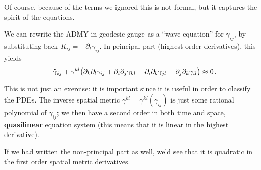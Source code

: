 \documentclass[main.tex]{subfiles}
\begin{document}
Of course, because of the terms we ignored this is not formal,  but it captures the spirit of the equations. 

We can rewrite the ADMY in geodesic gauge as a ``wave equation'' for \(\gamma_{ij}\), by substituting back \(K_{ij} = - \partial_{t} \gamma_{ij}\).
In principal part (highest order derivatives), this yields 
%
\begin{align}
- \ddot{\gamma}_{ij} + \gamma^{kl} \qty(\partial_{k} \partial_{l} \gamma_{ij} + \partial_{i} \partial_{j} \gamma_{kl} - \partial_{i} \partial_{k} \gamma_{jl} - \partial_{j} \partial_{k} \gamma_{il}) \approx 0 
\,.
\end{align}


This is not just an exercise: it is important since it is useful in order to classify the PDEs. 
The inverse spatial metric \(\gamma^{kl} = \gamma^{kl} (\gamma_{ij})\) is just some rational polynomial of \(\gamma_{ij}\); 
we then have a second order in both time and space, \textbf{quasilinear} equation system (this means that it is linear in the highest derivative).

If we had written the non-principal part as well, we'd see that it is quadratic in the first order spatial metric derivatives. 
\end{document}
